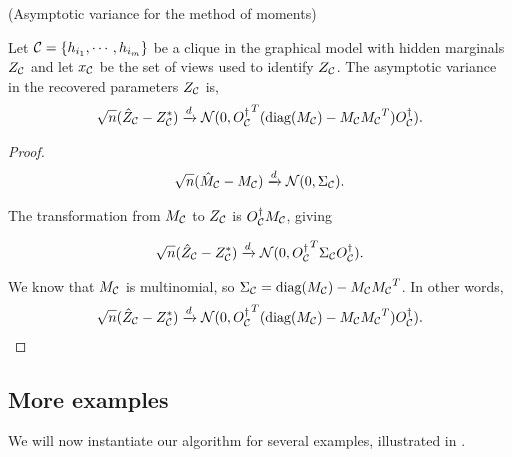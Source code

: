\begin{lemma}(Asymptotic variance for the method of moments)
  \label{lem:mom-variance}

  Let $\mathcal{C} = \{h_{i_1}, \cdots, h_{i_m}\}$ be a clique in the graphical
    model with hidden marginals $Z_{\mathcal{C}}$ and
  let $x_{\mathcal{C}}$ be the set of views used to identify $Z_{\mathcal{C}}$.
  The asymptotic variance in the recovered parameters $Z_{\mathcal{C}}$ is,
  \begin{align*}
    \sqrt{n}(\hat Z_{\mathcal{C}} - Z_{\mathcal{C}}^*) \xrightarrow{d} \mathcal{N}( 0, {{O}^{\dagger}_{\mathcal{C}}}^T (\textrm{diag}(M_{\mathcal{C}}) - M_{\mathcal{C}} {M_{\mathcal{C}}}^T) {O}^{\dagger}_{\mathcal{C}} ).
  \end{align*}
\end{lemma}
\begin{proof}
  \begin{align*}
    \sqrt{n}(\hat M_{\mathcal{C}} - M_{\mathcal{C}}) \xrightarrow{d} \mathcal{N}( 0, \Sigma_{\mathcal{C}} ).
  \end{align*}

  The transformation from $M_{\mathcal{C}}$ to $Z_{\mathcal{C}}$ is $O_{\mathcal{C}}^\dagger M_{\mathcal{C}}$, giving

  \begin{align*}
    \sqrt{n}(\hat Z_{\mathcal{C}} - Z_{\mathcal{C}}^*) \xrightarrow{d} \mathcal{N}( 0, {{O}^{\dagger}_{\mathcal{C}}}^T \Sigma_{\mathcal{C}} {O}^{\dagger}_{\mathcal{C}} ).
  \end{align*}

  We know that $M_{\mathcal{C}}$ is multinomial, so $\Sigma_{\mathcal{C}} = \textrm{diag}(M_{\mathcal{C}}) - M_{\mathcal{C}} {M_{\mathcal{C}}}^T$. In other words,
  \begin{align*}
    \sqrt{n}(\hat Z_{\mathcal{C}} - Z_{\mathcal{C}}^*) \xrightarrow{d} \mathcal{N}( 0, {{O}^{\dagger}_{\mathcal{C}}}^T (\textrm{diag}(M_{\mathcal{C}}) - M_{\mathcal{C}} {M_{\mathcal{C}}}^T) {O}^{\dagger}_{\mathcal{C}} ).
  \end{align*}
\end{proof}



\subsection{More examples}

We will now instantiate our algorithm for several examples, illustrated in .

